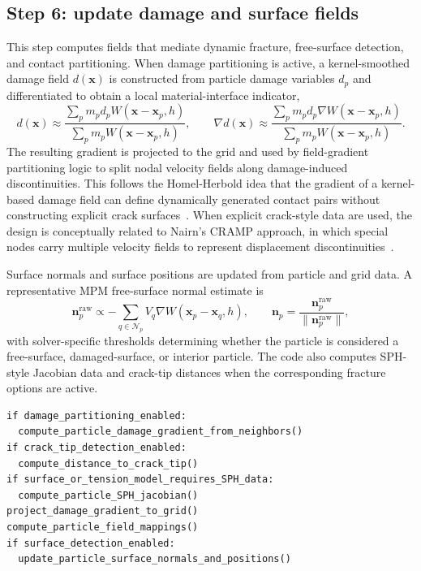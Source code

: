 \subsection{Step 6: update damage and surface fields}
\label{subsec:solver-step-6}
This step computes fields that mediate dynamic fracture, free-surface detection, and contact partitioning.  When damage partitioning is active, a kernel-smoothed damage field $d(\mathbf{x})$ is constructed from particle damage variables $d_p$ and differentiated to obtain a local material-interface indicator,
\begin{equation}
  d(\mathbf{x}) \approx \frac{\sum_p m_p d_p W(\mathbf{x}-\mathbf{x}_p,h)}{\sum_p m_p W(\mathbf{x}-\mathbf{x}_p,h)},
  \qquad
  \nabla d(\mathbf{x}) \approx \frac{\sum_p m_p d_p \nabla W(\mathbf{x}-\mathbf{x}_p,h)}{\sum_p m_p W(\mathbf{x}-\mathbf{x}_p,h)}.
\end{equation}
The resulting gradient is projected to the grid and used by field-gradient partitioning logic to split nodal velocity fields along damage-induced discontinuities.  This follows the Homel-Herbold idea that the gradient of a kernel-based damage field can define dynamically generated contact pairs without constructing explicit crack surfaces~\cite{homel2016dfg}.  When explicit crack-style data are used, the design is conceptually related to Nairn's CRAMP approach, in which special nodes carry multiple velocity fields to represent displacement discontinuities~\cite{nairn2003cramp}.

Surface normals and surface positions are updated from particle and grid data.  A representative MPM free-surface normal estimate is
\begin{equation}
  \mathbf{n}_{p}^{\mathrm{raw}} \propto -\sum_{q\in\mathcal{N}_p} V_q \nabla W(\mathbf{x}_p-\mathbf{x}_q,h),
  \qquad
  \mathbf{n}_p=\frac{\mathbf{n}_{p}^{\mathrm{raw}}}{\|\mathbf{n}_{p}^{\mathrm{raw}}\|},
\end{equation}
with solver-specific thresholds determining whether the particle is considered a free-surface, damaged-surface, or interior particle.  The code also computes SPH-style Jacobian data and crack-tip distances when the corresponding fracture options are active.

\begin{lstlisting}[caption={Damage and surface field update.},basicstyle=\ttfamily\small]
if damage_partitioning_enabled:
  compute_particle_damage_gradient_from_neighbors()
if crack_tip_detection_enabled:
  compute_distance_to_crack_tip()
if surface_or_tension_model_requires_SPH_data:
  compute_particle_SPH_jacobian()
project_damage_gradient_to_grid()
compute_particle_field_mappings()
if surface_detection_enabled:
  update_particle_surface_normals_and_positions()
\end{lstlisting}

